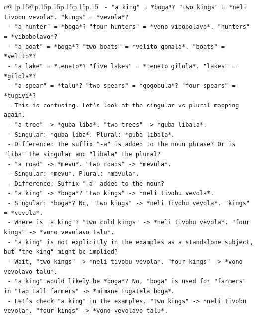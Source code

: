 \documentclass{article}
\begin{document}
{\begin{supertabular}{c@{$\;$}|p{.15\linewidth}@{}p{.15\linewidth}p{.15\linewidth}p{.15\linewidth}p{.15\linewidth}p{.15\linewidth}}
{{{\texttt{    {-} "a king" = *boga*? "two kings" = *neli tivobu vevola*. "kings" = *vevola*?} \\
\texttt{    {-} "a hunter" = *boga*? "four hunters" = *vono vibobolavo*. "hunters" = *vibobolavo*?} \\
\texttt{    {-} "a boat" = *boga*? "two boats" = *velito gonala*. "boats" = *velito*?} \\
\texttt{    {-} "a lake" = *teneto*? "five lakes" = *teneto gilola*. "lakes" = *gilola*?} \\
\texttt{    {-} "a spear" = *talu*? "two spears" = *gogobula*? "four spears" = *tugivi*?} \\
\texttt{    {-} This is confusing. Let's look at the singular vs plural mapping again.} \\
\texttt{    {-} "a tree" {-}> *guba liba*. "two trees" {-}> *guba libala*.} \\
\texttt{      {-} Singular: *guba liba*. Plural: *guba libala*.} \\
\texttt{      {-} Difference: The suffix "{-}a" is added to the noun phrase? Or is "liba" the singular and "libala" the plural?} \\
\texttt{      {-} "a road" {-}> *mevu*. "two roads" {-}> *mevula*.} \\
\texttt{        {-} Singular: *mevu*. Plural: *mevula*.} \\
\texttt{        {-} Difference: Suffix "{-}a" added to the noun?} \\
\texttt{      {-} "a king" {-}> *boga*? "two kings" {-}> *neli tivobu vevola*.} \\
\texttt{        {-} Singular: *boga*? No, "two kings" {-}> *neli tivobu vevola*. "kings" = *vevola*.} \\
\texttt{        {-} Where is "a king"? "two cold kings" {-}> *neli tivobu vevola*. "four kings" {-}> *vono vevolavo talu*.} \\
\texttt{        {-} "a king" is not explicitly in the examples as a standalone subject, but "the king" might be implied?} \\
\texttt{        {-} Wait, "two kings" {-}> *neli tivobu vevola*. "four kings" {-}> *vono vevolavo talu*.} \\
\texttt{        {-} "a king" would likely be *boga*? No, "boga" is used for "farmers" in "two tall farmers" {-}> *mimane tugatela boga*.} \\
\texttt{        {-} Let's check "a king" in the examples. "two kings" {-}> *neli tivobu vevola*. "four kings" {-}> *vono vevolavo talu*.} \\
}}}
\end{supertabular}}
\end{document}
